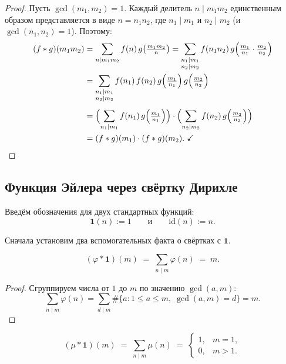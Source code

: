 \begin{proof}
	Пусть $\gcd(m_1, m_2) = 1$. Каждый делитель $n \mid m_1 m_2$ единственным образом
	представляется в виде $n = n_1 n_2$, где $n_1 \mid m_1$ и $n_2 \mid m_2$
	(и $\gcd(n_1, n_2) = 1$). Поэтому:
	\begin{align*}
		(f*g)(m_1 m_2)
		&= \sum_{n \mid m_1 m_2} f(n)\,g\!\left(\tfrac{m_1 m_2}{n}\right)
		= \sum_{\substack{n_1 \mid m_1 \\ n_2 \mid m_2}}
		f(n_1 n_2)\,g\!\left(\tfrac{m_1}{n_1}\cdot\tfrac{m_2}{n_2}\right)\\
		&= \sum_{\substack{n_1 \mid m_1 \\ n_2 \mid m_2}}
		f(n_1)\,f(n_2)\,g\!\left(\tfrac{m_1}{n_1}\right)g\!\left(\tfrac{m_2}{n_2}\right)
		\quad\text{}\\[4pt]
		&= \Bigl(\sum_{n_1 \mid m_1} f(n_1)\,g\!\left(\tfrac{m_1}{n_1}\right)\Bigr)
		\cdot
		\Bigl(\sum_{n_2 \mid m_2} f(n_2)\,g\!\left(\tfrac{m_2}{n_2}\right)\Bigr)\\
		&= (f*g)(m_1)\cdot (f*g)(m_2).\;\checkmark
	\end{align*}
\end{proof}

\subsection{Функция Эйлера через свёртку Дирихле}

Введём обозначения для двух стандартных функций:
\[
\mathbf{1}(n) := 1
\qquad\text{и}\qquad
\mathrm{id}(n) := n.
\]

Сначала установим два вспомогательных факта о свёртках с $\mathbf{1}$.

\begin{Statement}{}{}
	\[
	(\varphi * \mathbf{1})(m)
	\;=\; \sum_{n \mid m} \varphi(n)
	\;=\; m.
	\]
\end{Statement}

\begin{proof}
	Сгруппируем числа от $1$ до $m$ по значению $\gcd(a, m)$:
	\[
	\sum_{n \mid m} \varphi(n)
	= \sum_{d \mid m} \#\{a : 1 \leq a \leq m,\; \gcd(a,m)=d\}
	= m.
	\]
\end{proof}

\begin{Statement}{}{}
	\[
	(\mu * \mathbf{1})(m)
	\;=\; \sum_{n \mid m} \mu(n)
	\;=\;
	\begin{cases} 1, & m = 1, \\ 0, & m > 1. \end{cases}
	\]
\end{Statement}

